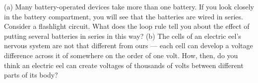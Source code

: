         (a) Many battery-operated devices take more than one
        battery. If you look closely in the battery compartment, you
        will see that the batteries are wired in series. Consider a
        flashlight circuit. What does the loop rule tell you about
        the effect of putting several batteries in series in this
        way? \hwendpart
        (b) The cells of an electric eel's nervous system are
        not that different from ours --- each cell can develop a
        voltage difference across it of somewhere on the order of
        one volt. How, then, do you think an electric eel can create
        voltages of thousands of volts between different parts of its body?
